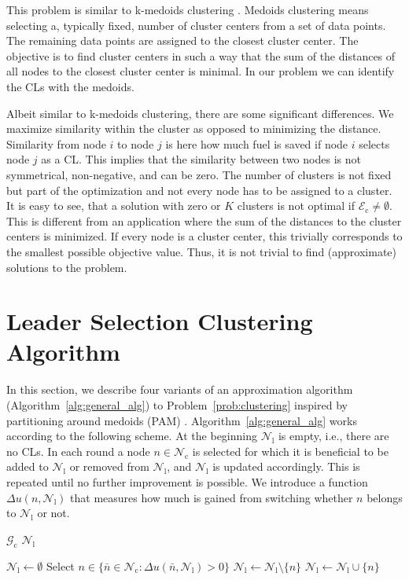 \documentclass[letterpaper,10pt,conference,twocolumn]{IEEEtran}
\newcommand{\set}[1]{\mathcal{#1}}
\newcommand{\op}[1]{\mathrm{#1}}
\theoremstyle{definition}
\begin{document}
This problem is similar to k-medoids clustering \cite{pam_book}. Medoids clustering means selecting a, typically fixed, number of cluster centers from a set of data points. The remaining data points are assigned to the closest cluster center. The objective is to find cluster centers in such a way that the sum of the distances of all nodes to the closest cluster center is minimal. In our problem we can identify the CLs with the medoids. 

Albeit similar to k-medoids clustering, there are some significant differences. We maximize similarity within the cluster as opposed to minimizing the distance. Similarity from node $i$ to node $j$ is here how much fuel is saved if node $i$ selects node $j$ as a CL. This implies that the similarity between two nodes is not symmetrical, non-negative, and can be zero.  The number of clusters is not fixed but part of the optimization and not every node has to be assigned to a cluster. It is easy to see, that a solution with zero or $K$ clusters is not optimal if $\set{E}_\op{c} \neq \emptyset$. This is different from an application where the sum of the distances to the cluster centers is minimized. If every node is a cluster center, this trivially corresponds to the smallest possible objective value. Thus, it is not trivial to find (approximate) solutions to the problem.


\section{Leader Selection Clustering Algorithm}
\label{sec:approxmation_algs}

In this section, we describe four variants of an approximation algorithm (Algorithm~\ref{alg:general_alg}) to Problem~\ref{prob:clustering} inspired by partitioning around medoids (PAM) \cite{pam_book}. 
Algorithm~\ref{alg:general_alg} works according to the following scheme. At the beginning $\set{N}_\op{l}$ is empty, i.e., there are no CLs. In each round a node $n \in \set{N}_\op{c}$ is selected for which it is beneficial to be added to $\set{N}_\op{l}$ or removed from $\set{N}_\op{l}$, and $\set{N}_\op{l}$ is updated accordingly. This is repeated until no further improvement is possible. We introduce a function $\Delta u(n,\set{N}_\op{l})$ that measures how much is gained from switching whether $n$ belongs to $\set{N}_\op{l}$ or not.

\begin{algorithm}
\begin{algorithmic}
\Require $\set{G}_\op{c}$
\Ensure $\set{N}_\op{l}$

\State $\set{N}_\op{l} \leftarrow \emptyset$
\While{$\{\bar{n} \in \set{N}_\op{c}: \Delta u(\bar{n},\set{N}_\op{l}) > 0\} \neq \emptyset$}
  \State Select $n \in \{\bar{n} \in \set{N}_\op{c}: \Delta u(\bar{n},\set{N}_\op{l}) > 0\}$
    \If {$n \in \set{N}_\op{l}$}
      \State $\set{N}_\op{l} \leftarrow \set{N}_\op{l} \setminus \{n\}$
    \Else
      \State $\set{N}_\op{l} \leftarrow \set{N}_\op{l} \cup \{n\}$
    \EndIf
\EndWhile
\end{algorithmic}
\caption{}\label{alg:general_alg}
\end{algorithm}
\end{document}
